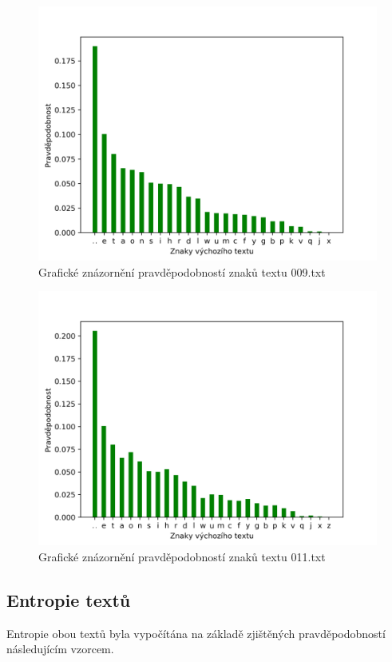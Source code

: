 \documentclass[12pt]{article}
\begin{document}
\begin{figure}[!htb]
\includegraphics[scale=0.8]{../009_char_prob.png}\centering\caption{Grafické znázornění pravděpodobností znaků textu 009.txt}\label{009_graph}
\end{figure}

\begin{figure}[!htb]
\includegraphics[scale=0.8]{../011_char_prob.png}\centering\caption{Grafické znázornění pravděpodobností znaků textu 011.txt}\label{011_graph}
\end{figure}
		
		
		\subsection{Entropie textů}\label{et}
			Entropie obou textů byla vypočítána na základě zjištěných pravděpodobností následujícím vzorcem. 
\end{document}
